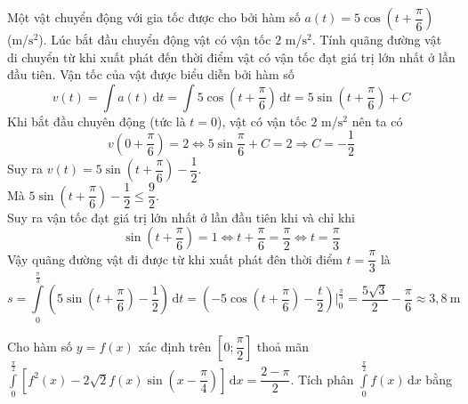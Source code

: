 \begin{ex}%
Một vật chuyển động với gia tốc được cho bởi hàm số $a(t)=5\cos\left(t+\dfrac{\pi}{6}\right)$ (m/$\mathrm{s}^2$). Lúc bắt đầu chuyển động vật có vận tốc $2$ m/$\mathrm{s}^2$. Tính quãng đường vật di chuyển từ khi xuất phát đến thời điểm vật có vận tốc đạt giá trị lớn nhất ở lần đầu tiên.
\loigiai
{Vận tốc của vật được biểu diễn bởi hàm số \[v(t)=\displaystyle\int a(t)\mathrm{\,d}t=\displaystyle\int 5\cos\left(t+\dfrac{\pi}{6}\right)\mathrm{\,d}t=5\sin\left(t+\dfrac{\pi}{6}\right)+C\]
Khi bắt đầu chuyên động (tức là $t=0$), vật có vận tốc $2$ m/$\mathrm{s}^2$ nên ta có\[v\left(0+\dfrac{\pi}{6}\right)=2\Leftrightarrow 5\sin\dfrac{\pi}{6}+C=2\Rightarrow C=-\dfrac{1}{2}\]
Suy ra $v(t)=5\sin\left(t+\dfrac{\pi}{6}\right)-\dfrac{1}{2}$.\\
Mà $5\sin\left(t+\dfrac{\pi}{6}\right)-\dfrac{1}{2}\leq \dfrac{9}{2}$.\\
Suy ra vận tốc đạt giá trị lớn nhất ở lần đầu tiên khi và chỉ khi \[\sin\left(t+\dfrac{\pi}{6}\right)=1\Leftrightarrow t+\dfrac{\pi}{6}=\dfrac{\pi}{2}\Leftrightarrow t=\dfrac{\pi}{3}\]
Vậy quãng đường vật đi được từ khi xuất phát đên thời điểm $t=\dfrac{\pi}{3}$ là
\[s=\displaystyle\int\limits_{0}^{\frac{\pi}{3}}\left(5\sin\left(t+\dfrac{\pi}{6}\right)-\dfrac{1}{2}\right)\mathrm{\,d}t=\left(-5\cos\left(t+\dfrac{\pi}{6}\right)-\dfrac{t}{2}\right)\Big|_0^{\frac{\pi}{3}}=\dfrac{5\sqrt{3}}{2}-\dfrac{\pi}{6}\approx 3{,}8~\mathrm{m}\]
}
\end{ex}

\begin{ex}%
Cho hàm số $y=f(x)$ xác định trên $\left[0;\dfrac{\pi}{2}\right]$ thoả mãn $ \displaystyle \int\limits_0^{\tfrac{\pi}{2}} \left[f^2(x)-2\sqrt{2}f(x)\sin\left(x-\dfrac{\pi}{4}\right)\right]\mathrm{\,d}x=\dfrac{2-\pi}{2}$. Tích phân $\displaystyle \int\limits_0^{\tfrac{\pi}{2}} f(x)\mathrm{\,d}x$ bằng
\end{ex}

